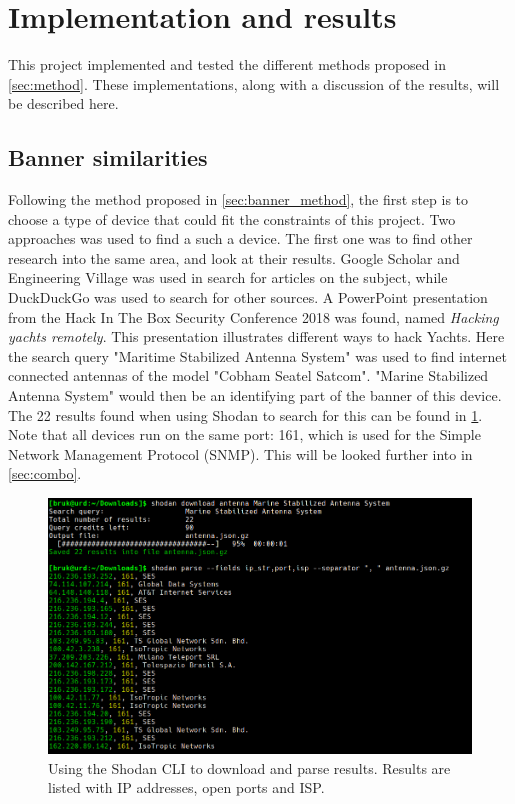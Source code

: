 \section{Implementation and results} \label{sec:results}
This project implemented and tested the different methods proposed in \cref{sec:method}. These implementations, along with a discussion of the results, will be described here. 

\subsection{Banner similarities} \label{sec:banner_results}
Following the method proposed in \cref{sec:banner_method}, the first step is to choose a type of device that could fit the constraints of this project. Two approaches was used to find a such a device. The first one was to find other research into the same area, and look at their results. Google Scholar\cite{google_scholar} and Engineering Village\cite{engineering_village} was used in search for articles on the subject, while DuckDuckGo\cite{ddg} was used to search for other sources. A PowerPoint presentation from the Hack In The Box Security Conference 2018 was found, named \textit{Hacking yachts remotely}. This presentation illustrates different ways to hack Yachts. Here the search query "Maritime Stabilized Antenna System" was used to find internet connected antennas of the model "Cobham Seatel Satcom". 
"Marine Stabilized Antenna System" would then be an identifying part of the banner of this device. The 22 results found when using Shodan to search for this can be found in \cref{fig:banner_parsing}. Note that all devices run on the same port: 161, which is used for the Simple Network Management Protocol (SNMP). This will be looked further into in \cref{sec:combo}.

\begin{figure} [H]
    \centering
    \includegraphics[scale=0.4]{Figurer/banner_parsing.png}
    \caption{Using the Shodan CLI to download and parse results. Results are listed with IP addresses, open ports and ISP.}
    \label{fig:banner_parsing}
\end{figure}

